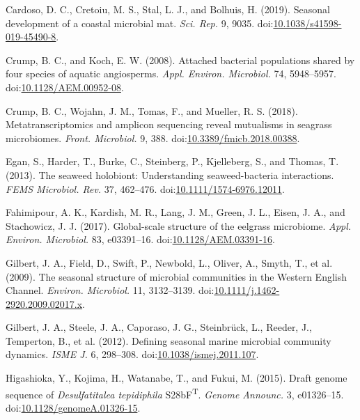 \documentclass[
  12pt,
]{article}
\begin{document}
\leavevmode\hypertarget{ref-Cardoso2019}{}%
Cardoso, D. C., Cretoiu, M. S., Stal, L. J., and Bolhuis, H. (2019).
Seasonal development of a coastal microbial mat. \emph{Sci. Rep.} 9,
9035.
doi:\href{https://doi.org/10.1038/s41598-019-45490-8}{10.1038/s41598-019-45490-8}.

\leavevmode\hypertarget{ref-Crump2008}{}%
Crump, B. C., and Koch, E. W. (2008). Attached bacterial populations
shared by four species of aquatic angiosperms. \emph{Appl. Environ.
Microbiol.} 74, 5948--5957.
doi:\href{https://doi.org/10.1128/AEM.00952-08}{10.1128/AEM.00952-08}.

\leavevmode\hypertarget{ref-Crump2018}{}%
Crump, B. C., Wojahn, J. M., Tomas, F., and Mueller, R. S. (2018).
Metatranscriptomics and amplicon sequencing reveal mutualisms in
seagrass microbiomes. \emph{Front. Microbiol.} 9, 388.
doi:\href{https://doi.org/10.3389/fmicb.2018.00388}{10.3389/fmicb.2018.00388}.

\leavevmode\hypertarget{ref-Egan2013}{}%
Egan, S., Harder, T., Burke, C., Steinberg, P., Kjelleberg, S., and
Thomas, T. (2013). The seaweed holobiont: Understanding seaweed-bacteria
interactions. \emph{FEMS Microbiol. Rev.} 37, 462--476.
doi:\href{https://doi.org/10.1111/1574-6976.12011}{10.1111/1574-6976.12011}.

\leavevmode\hypertarget{ref-Fahimipour2017}{}%
Fahimipour, A. K., Kardish, M. R., Lang, J. M., Green, J. L., Eisen, J.
A., and Stachowicz, J. J. (2017). Global-scale structure of the eelgrass
microbiome. \emph{Appl. Environ. Microbiol.} 83, e03391--16.
doi:\href{https://doi.org/10.1128/AEM.03391-16}{10.1128/AEM.03391-16}.

\leavevmode\hypertarget{ref-Gilbert2009}{}%
Gilbert, J. A., Field, D., Swift, P., Newbold, L., Oliver, A., Smyth,
T., et al. (2009). The seasonal structure of microbial communities in
the Western English Channel. \emph{Environ. Microbiol.} 11, 3132--3139.
doi:\href{https://doi.org/10.1111/j.1462-2920.2009.02017.x}{10.1111/j.1462-2920.2009.02017.x}.

\leavevmode\hypertarget{ref-Gilbert2012}{}%
Gilbert, J. A., Steele, J. A., Caporaso, J. G., Steinbrück, L., Reeder,
J., Temperton, B., et al. (2012). Defining seasonal marine microbial
community dynamics. \emph{ISME J.} 6, 298--308.
doi:\href{https://doi.org/10.1038/ismej.2011.107}{10.1038/ismej.2011.107}.

\leavevmode\hypertarget{ref-Higashioka2015}{}%
Higashioka, Y., Kojima, H., Watanabe, T., and Fukui, M. (2015). Draft
genome sequence of \emph{Desulfatitalea tepidiphila}
S28bF\textsuperscript{T}. \emph{Genome Announc.} 3, e01326--15.
doi:\href{https://doi.org/10.1128/genomeA.01326-15}{10.1128/genomeA.01326-15}.
\end{document}
